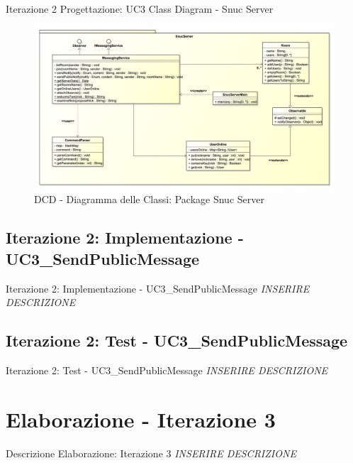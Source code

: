 \documentclass[t]{beamer} %
\begin{document}
\begin{frame} {Iterazione 2 Progettazione: UC3 Class Diagram - Snuc Server}
   \begin{figure}
     \includegraphics[scale=0.245]{image_astah/Iteration_2_DesignModel/ClassDiagramSnucServer.png}{\centering}
     \caption{DCD - Diagramma delle Classi: Package Snuc Server }
     \label{fig_UC3_DCD_2} 
   \end{figure}
\end{frame}

\subsection{Iterazione 2: Implementazione - UC3\_SendPublicMessage}
\begin{frame} {Iterazione 2: Implementazione - UC3\_SendPublicMessage}
  \emph{INSERIRE DESCRIZIONE}
\end{frame}

\subsection {Iterazione 2: Test - UC3\_SendPublicMessage}
\begin{frame} {Iterazione 2: Test - UC3\_SendPublicMessage}
  \emph{INSERIRE DESCRIZIONE}
\end{frame}

\section{Elaborazione - Iterazione 3}
\begin{frame} {Descrizione Elaborazione: Iterazione 3}
  \emph{INSERIRE DESCRIZIONE}
\end{frame}
\end{document}
